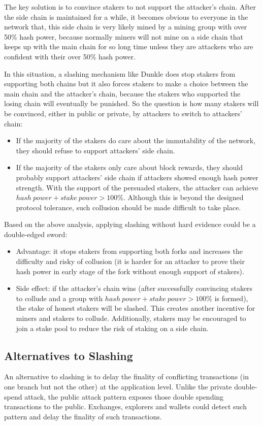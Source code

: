 \documentclass[a4paper]{article}
\begin{document}
\begin{appendices}
The key solution is to convince stakers to not support the attacker's chain. After the side chain is maintained for a while, it becomes obvious to everyone in the network that, this side chain is very likely mined by a mining group with over 50\% hash power, because normally miners will not mine on a side chain that keeps up with the main chain for so long time unless they are attackers who are confident with their over 50\% hash power.

In this situation, a slashing mechanism like Dunkle does stop stakers from supporting both chains but it also forces stakers to make a choice between the main chain and the attacker's chain, because the stakers who supported the losing chain will eventually be punished. So the question is how many stakers will be convinced, either in public or private, by attackers to switch to attackers' chain:

\begin{itemize}
    \item If the majority of the stakers do care about the immutability of the network, they should refuse to support attackers' side chain.
    \item If the majority of the stakers only care about block rewards, they should probably support attackers' side chain if attackers showed enough hash power strength. With the support of the persuaded stakers, the attacker can achieve $hash\ power + stake\ power > 100\%$. Although this is beyond the designed protocol tolerance, such collusion should be made difficult to take place.
\end{itemize}

Based on the above analysis, applying slashing without hard evidence could be a double-edged sword:
\begin{itemize}
    \item Advantage: it stops stakers from supporting both forks and increases the difficulty and risky of collusion (it is harder for an attacker to prove their hash power in early stage of the fork without enough support of stakers).
    \item Side effect: if the attacker's chain wins (after successfully convincing stakers to collude and a group with $hash\ power + stake\ power > 100\%$ is formed), the stake of honest stakers will be slashed. This creates another incentive for miners and stakers to collude. Additionally, stakers may be encouraged to join a stake pool to reduce the risk of staking on a side chain.
\end{itemize}

\subsection{Alternatives to Slashing}

An alternative to slashing is to delay the finality of conflicting transactions (in one branch but not the other) at the application level. Unlike the private double-spend attack, the public attack pattern exposes those double spending transactions to the public. Exchanges, explorers and wallets could detect such pattern and delay the finality of such transactions.

\end{appendices}
\end{document}
